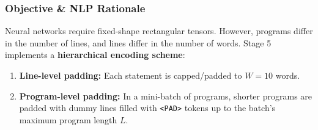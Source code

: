 \documentclass[11pt,a4paper]{article}
\begin{document}
\subsubsection{Objective \& NLP Rationale}
Neural networks require fixed-shape rectangular tensors. However, programs differ in the number of lines, and lines differ in the number of words. Stage 5 implements a \textbf{hierarchical encoding scheme}:
\begin{enumerate}
    \item \textbf{Line-level padding:} Each statement is capped/padded to $W=10$ words.
    \item \textbf{Program-level padding:} In a mini-batch of programs, shorter programs are padded with dummy lines filled with \texttt{<PAD>} tokens up to the batch's maximum program length $L$.
\end{enumerate}
\end{document}

